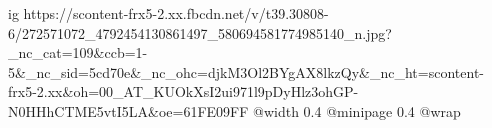  
 
 
 
 

\ifcmt
  ig https://scontent-frx5-2.xx.fbcdn.net/v/t39.30808-6/272571072_4792454130861497_580694581774985140_n.jpg?_nc_cat=109&ccb=1-5&_nc_sid=5cd70e&_nc_ohc=djkM3Ol2BYgAX8lkzQy&_nc_ht=scontent-frx5-2.xx&oh=00_AT_KUOkXsI2ui971l9pDyHlz3ohGP-N0HHhCTME5vtI5LA&oe=61FE09FF
  @width 0.4
  @minipage 0.4
  @wrap \parpic[r]
\fi
